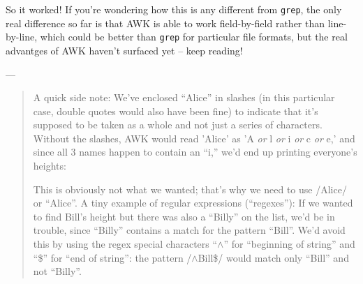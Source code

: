 \documentclass[10pt,a4]{article}
\begin{document}
\ttfamily
\colorbox{black}{}
\normalfont

So it worked! If you're wondering how this is any different from \texttt{grep}, the only real difference so far is that AWK is able to work field-by-field rather than line-by-line, which could be better than \texttt{grep} for particular file formats, but the real advantges of AWK haven't surfaced yet -- keep reading!

---

\begin{quote}

A quick side note: We've enclosed ``Alice'' in slashes (in this particular case, double quotes would also have been fine) to indicate that it's supposed to be taken as a whole and not just a series of characters. Without the slashes, AWK would read 'Alice' as 'A \textit{or} l \textit{or} i \textit{or} c \textit{or} e,' and since all 3 names happen to contain an ``i,'' we'd end up printing everyone's heights:

\ttfamily
\colorbox{black}{}
\normalfont

This is obviously not what we wanted; that's why we need to use /Alice/ or ``Alice''. A tiny example of regular expressions (``regexes''): If we wanted to find Bill's height but there was also a ``Billy'' on the list, we'd be in trouble, since ``Billy'' contains a match for the pattern ``Bill''. We'd avoid this by using the regex special characters ``$\wedge$'' for ``beginning of string'' and ``\$'' for ``end of string'': the pattern /$\wedge$Bill\$/ would match only ``Bill'' and not ``Billy''.

\end{quote}
\end{document}
